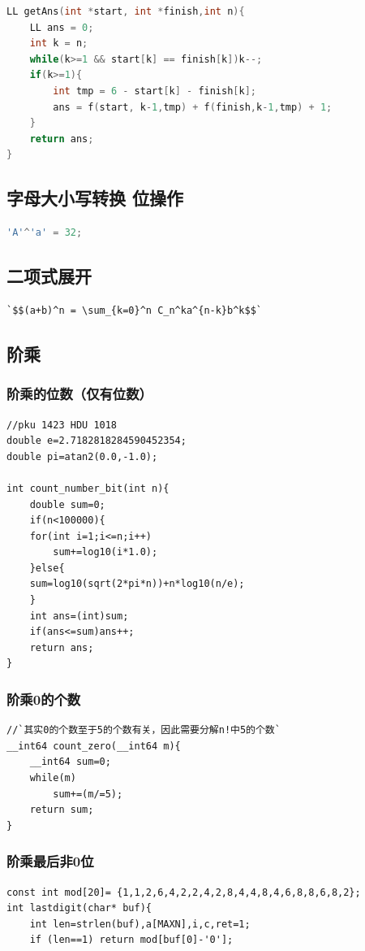 \documentclass[a4paper]{article}
\begin{document}
\begin{CJK*}{UTF8}{gbsn}
\begin{multicols}{3}
\begin{flushleft}
\begin{lstlisting}[language={c++}]
LL getAns(int *start, int *finish,int n){
    LL ans = 0;
    int k = n;
    while(k>=1 && start[k] == finish[k])k--;
    if(k>=1){
        int tmp = 6 - start[k] - finish[k];
        ans = f(start, k-1,tmp) + f(finish,k-1,tmp) + 1;
    }
    return ans;
}

\end{lstlisting}


\subsection{字母大小写转换 位操作}
\begin{lstlisting}[language={c++}]
'A'^'a' = 32; 
\end{lstlisting}


\subsection{二项式展开}
\begin{lstlisting}
`$$(a+b)^n = \sum_{k=0}^n C_n^ka^{n-k}b^k$$`
\end{lstlisting}


\subsection{阶乘}

\subsubsection{阶乘的位数（仅有位数）}
\begin{lstlisting}
//pku 1423 HDU 1018
double e=2.7182818284590452354;
double pi=atan2(0.0,-1.0);

int count_number_bit(int n){
	double sum=0;
	if(n<100000){
	for(int i=1;i<=n;i++)
		sum+=log10(i*1.0);
	}else{
	sum=log10(sqrt(2*pi*n))+n*log10(n/e);
	}
	int ans=(int)sum;
	if(ans<=sum)ans++;
	return ans;
} 
\end{lstlisting}


\subsubsection{阶乘0的个数}
\begin{lstlisting}
//`其实0的个数至于5的个数有关，因此需要分解n!中5的个数`
__int64 count_zero(__int64 m){
	__int64 sum=0;
	while(m)
		sum+=(m/=5);
	return sum;
}
\end{lstlisting}


\subsubsection{阶乘最后非0位}
\begin{lstlisting}
const int mod[20]= {1,1,2,6,4,2,2,4,2,8,4,4,8,4,6,8,8,6,8,2}; 
int lastdigit(char* buf){ 
    int len=strlen(buf),a[MAXN],i,c,ret=1; 
    if (len==1) return mod[buf[0]-'0']; 
    

\end{lstlisting}
\end{flushleft}
\end{multicols}
\end{CJK*}
\end{document}
